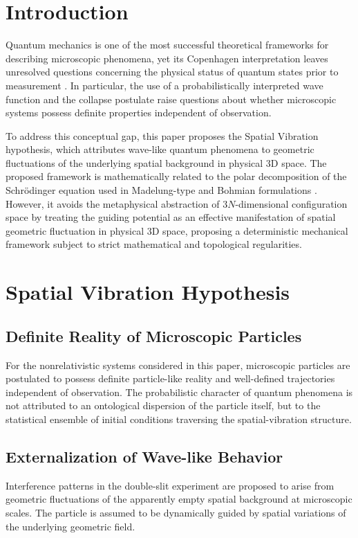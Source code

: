 \documentclass[reprint,amsmath,amssymb,aps,prd]{revtex4-2}
\begin{document}
\maketitle

\section{Introduction}
Quantum mechanics is one of the most successful theoretical frameworks for describing microscopic phenomena, yet its Copenhagen interpretation leaves unresolved questions concerning the physical status of quantum states prior to measurement \cite{Einstein1935}. In particular, the use of a probabilistically interpreted wave function and the collapse postulate raise questions about whether microscopic systems possess definite properties independent of observation.

To address this conceptual gap, this paper proposes the Spatial Vibration hypothesis, which attributes wave-like quantum phenomena to geometric fluctuations of the underlying spatial background in physical 3D space. The proposed framework is mathematically related to the polar decomposition of the Schr\"{o}dinger equation used in Madelung-type and Bohmian formulations \cite{Madelung1927, Bohm1952}. However, it avoids the metaphysical abstraction of $3N$-dimensional configuration space by treating the guiding potential as an effective manifestation of spatial geometric fluctuation in physical 3D space, proposing a deterministic mechanical framework subject to strict mathematical and topological regularities.

\section{Spatial Vibration Hypothesis}

\subsection{Definite Reality of Microscopic Particles}
For the nonrelativistic systems considered in this paper, microscopic particles are postulated to possess definite particle-like reality and well-defined trajectories independent of observation. The probabilistic character of quantum phenomena is not attributed to an ontological dispersion of the particle itself, but to the statistical ensemble of initial conditions traversing the spatial-vibration structure.

\subsection{Externalization of Wave-like Behavior}
Interference patterns in the double-slit experiment are proposed to arise from geometric fluctuations of the apparently empty spatial background at microscopic scales. The particle is assumed to be dynamically guided by spatial variations of the underlying geometric field.
\end{document}
